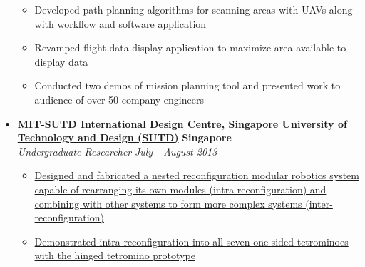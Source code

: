 \documentclass[10pt,letterpaper]{article}
\begin{document}
\begin{itemize}
	\begin{itemize}[label=\textbullet]
	\itemsep0em
	\item Developed path planning algorithms for scanning areas with UAVs along with workflow and software application
	\item Revamped flight data display application to maximize area available to display data
	\item Conducted two demos of mission planning tool and presented work to audience of over 50 company engineers

\end{itemize}

    \item[]
    {\href{http://www.sutd.edu.sg/idc.aspx}{\textbf{MIT-SUTD International Design Centre, Singapore University of Technology and Design (SUTD)}} \hfill
      \textbf{Singapore}}
    \\
    {\emph{Undergraduate Researcher} \hfill \emph{July - August 2013}}
	
	\begin{itemize}[label=\textbullet]
	\itemsep0em
	\item {\href{http://vincentkee.wordpress.com/tetromino/}{Designed and fabricated a nested reconfiguration modular robotics system capable of rearranging its own modules (intra-reconfiguration) and combining with other systems to form more complex systems (inter-reconfiguration)}}
	\item {\href{http://www.youtube.com/watch?v=YFhAlsQ3uYQ}{Demonstrated intra-reconfiguration into all seven one-sided tetrominoes with the hinged tetromino prototype}}

\end{itemize}


%	
\end{itemize}
\end{document}
